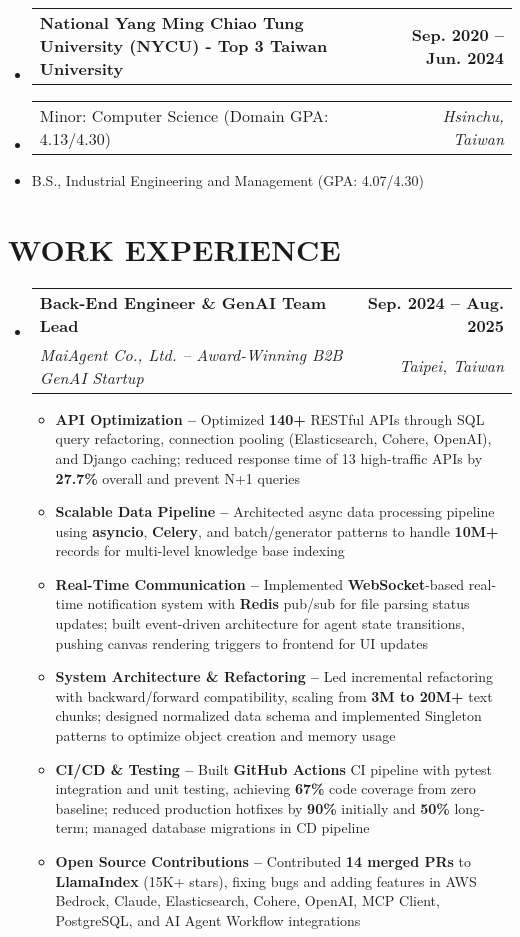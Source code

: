 \documentclass[letterpaper,11pt]{article}
\makeatletter
\newcommand{\resumeItem}[1]{
  \item\small{#1}
}
\newcommand{\resumeSubheadingnull}[2]{
  \item
    \begin{tabular*}{1.0\textwidth}[t]{l@{\extracolsep{\fill}}r}
      \textbf{#1} & \textbf{\small #2} \\
    \end{tabular*}\vspace{3pt}
}
\newcommand{\resumeSubheadinga}[4]{
  \vspace{-3pt}\item
    \begin{tabular*}{1.0\textwidth}[t]{l@{\extracolsep{\fill}}r}
      \textbf{#1} & \textbf{\small #2} \\
      \textit{\small#3} & \textit{\small #4} \\
    \end{tabular*}
}
\newcommand{\resumeSubItema}[2]{
  \item
    \begin{tabular*}{1.0\textwidth}[t]{l@{\extracolsep{\fill}}r}
      \small#1 & \textit{\small #2} \\
    \end{tabular*}
}
\newcommand{\resumeSubItem}[1]{\resumeItem{#1}}
\newcommand{\resumeSubHeadingListStart}{\begin{itemize}[leftmargin=0.0in, label={}]}
\newcommand{\resumeSubHeadingListEnd}{\end{itemize}}
\newcommand{\resumeItemListStart}{\begin{itemize}[label=$\vcenter{\hbox{\tiny$\bullet$}}$]}
\newcommand{\resumeItemListEnd}{\end{itemize}}
\makeatother
\begin{document}
\resumeSubHeadingListStart
\resumeSubheadingnull
{National Yang Ming Chiao Tung University (NYCU) - Top 3 Taiwan University }{Sep. 2020 -- Jun. 2024}
\vspace{-20pt}
\resumeSubItema{Minor: Computer Science (Domain GPA: 4.13/4.30)}{Hsinchu, Taiwan}
\vspace{-15pt}
\resumeSubItem{B.S., Industrial Engineering and Management (GPA: 4.07/4.30)}
\resumeSubHeadingListEnd

\vspace{-6pt}



\section{WORK EXPERIENCE}
\vspace{2pt}
\resumeSubHeadingListStart
\resumeSubheadinga
{Back-End Engineer \& GenAI Team Lead}{Sep. 2024 -- Aug. 2025}
{MaiAgent Co., Ltd. -- Award-Winning B2B GenAI Startup}{Taipei, Taiwan}
\vspace{-6pt}
\resumeItemListStart
\resumeItem{\textbf{API Optimization --} Optimized \textbf{140+} RESTful APIs through SQL query refactoring, connection pooling (Elasticsearch, Cohere, OpenAI), and Django caching; reduced response time of 13 high-traffic APIs by \textbf{27.7\%} overall and prevent N+1 queries}
\resumeItem{\textbf{Scalable Data Pipeline --} Architected async data processing pipeline using \textbf{asyncio}, \textbf{Celery}, and batch/generator patterns to handle \textbf{10M+} records for multi-level knowledge base indexing}
\resumeItem{\textbf{Real-Time Communication --} Implemented \textbf{WebSocket}-based real-time notification system with \textbf{Redis} pub/sub for file parsing status updates; built event-driven architecture for agent state transitions, pushing canvas rendering triggers to frontend for UI updates}
\resumeItem{\textbf{System Architecture \& Refactoring --} Led incremental refactoring with backward/forward compatibility, scaling from \textbf{3M to 20M+} text chunks; designed normalized data schema and implemented Singleton patterns to optimize object creation and memory usage}
\resumeItem{\textbf{CI/CD \& Testing --} Built \textbf{GitHub Actions} CI pipeline with pytest integration and unit testing, achieving \textbf{67\%} code coverage from zero baseline; reduced production hotfixes by \textbf{90\%} initially and \textbf{50\%} long-term; managed database migrations in CD pipeline}
\resumeItem{\textbf{Open Source Contributions --} Contributed \textbf{14 merged PRs} to \textbf{LlamaIndex} (15K+ stars), fixing bugs and adding features in AWS Bedrock, Claude, Elasticsearch, Cohere, OpenAI, MCP Client, PostgreSQL, and AI Agent Workflow integrations}
\resumeItemListEnd
\resumeSubHeadingListEnd
\end{document}
